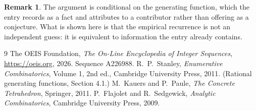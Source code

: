 \documentclass[11pt,a4paper]{article}
\theoremstyle{plain}
\theoremstyle{definition}
\newtheorem{remark}[theorem]{Remark}
\begin{document}
\begin{remark}
The argument is conditional on the generating function, which the entry records as a fact and
attributes to a contributor rather than offering as a conjecture. What is shown here is that
the empirical recurrence is not an independent guess: it is equivalent to information the
entry already contains.
\end{remark}

\begin{thebibliography}{9}
 The OEIS Foundation, \emph{The On-Line Encyclopedia of Integer
Sequences}, \url{https://oeis.org}, 2026. Sequence A226988.
 R.~P.~Stanley, \emph{Enumerative Combinatorics}, Volume 1, 2nd ed.,
Cambridge University Press, 2011. (Rational generating functions, Section 4.1.)
 M.~Kauers and P.~Paule, \emph{The Concrete Tetrahedron}, Springer, 2011.
 P.~Flajolet and R.~Sedgewick, \emph{Analytic Combinatorics}, Cambridge
University Press, 2009.
\end{thebibliography}
\end{document}
